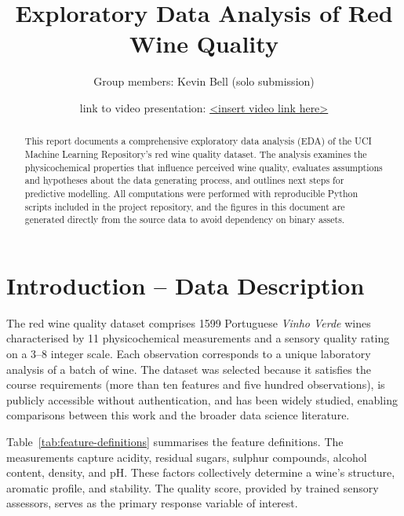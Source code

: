 \documentclass[11pt]{article}
\title{Exploratory Data Analysis of Red Wine Quality}
\author{Group members: Kevin Bell (solo submission)}
\date{\vspace{-1em}\small link to video presentation: \url{<insert video link here>}}
\begin{document}
\maketitle

\begin{abstract}
This report documents a comprehensive exploratory data analysis (EDA) of the UCI
Machine Learning Repository's red wine quality dataset. The analysis examines
the physicochemical properties that influence perceived wine quality, evaluates
assumptions and hypotheses about the data generating process, and outlines next
steps for predictive modelling. All computations were performed with reproducible
Python scripts included in the project repository, and the figures in this
document are generated directly from the source data to avoid dependency on
binary assets.
\end{abstract}

\section{Introduction -- Data Description}
The red wine quality dataset comprises \num{1599} Portuguese \emph{Vinho Verde}
wines characterised by \num{11} physicochemical measurements and a sensory
quality rating on a \numrange{3}{8} integer scale. Each observation corresponds
to a unique laboratory analysis of a batch of wine. The dataset was selected
because it satisfies the course requirements (more than ten features and five
hundred observations), is publicly accessible without authentication, and has
been widely studied, enabling comparisons between this work and the broader data
science literature.

Table~\ref{tab:feature-definitions} summarises the feature definitions.
The measurements capture acidity, residual sugars, sulphur compounds, alcohol
content, density, and pH. These factors collectively determine a wine's
structure, aromatic profile, and stability. The quality score, provided by
trained sensory assessors, serves as the primary response variable of interest.
\end{document}
